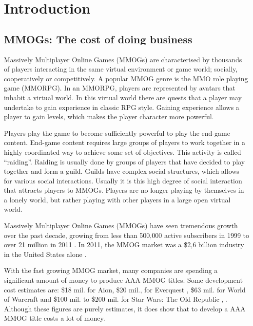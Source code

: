 \chapter{Introduction}
\label{chp:INTRO}

\section{MMOGs: The cost of doing business}
Massively Multiplayer Online Games (MMOGs) are characterised by thousands of players interacting in the same virtual environment or game world; socially, cooperatively or competitively. A popular MMOG genre is the MMO role playing game (MMORPG). In an MMORPG, players are represented by avatars that inhabit a virtual world. In this virtual world there are quests that a player may undertake to gain experience in classic RPG style. Gaining experience allows a player to gain levels, which makes the player character more powerful.

Players play the game to become sufficiently powerful to play the end-game content. End-game content requires large groups of players to work together in a highly coordinated way to achieve some set of objectives. This activity is called ``raiding''. Raiding is usually done by groups of players that have decided to play together and form a guild. Guilds have complex social structures, which allows for various social interactions. Usually it is this high degree of social interaction that attracts players to MMOGs. Players are no longer playing by themselves in a lonely world, but rather playing with other players in a large open virtual world.

Massively Multiplayer Online Games (MMOGs) have seen tremendous growth over the past decade, growing from less than 500,000 active subscribers in 1999 to over 21 million in 2011 \cite{mmo_growth_chart}. In 2011, the MMOG market was a \$2,6 billion industry in the United States alone \cite{newzoo_mmo_report}.

With the fast growing MMOG market, many companies are spending a significant amount of money to produce AAA MMOG titles. Some development cost estimates are: \$18 mil. for Aion, \$20 mil., for Everquest \cite{aion_everquest_cost}, \$63 mil. for World of Warcraft \cite{wow_cost} and \$100 mil. to \$200 mil. for Star Wars: The Old Republic \cite{star_wars_cost_1}, \cite{star_wars_cost_2}. Although these figures are purely estimates, it does show that to develop a AAA MMOG title costs a lot of money.

